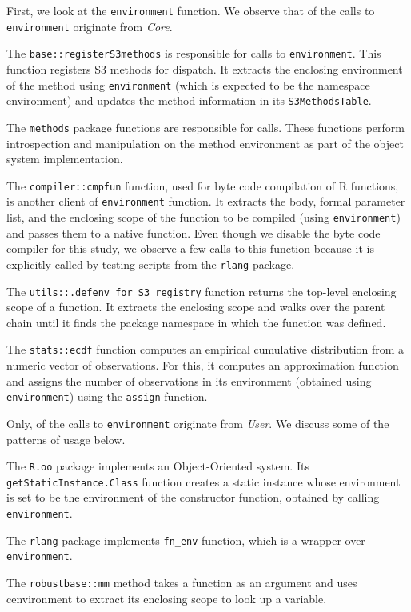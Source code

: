 \documentclass[10pt,review,sigplan,anonymous=true,authorversion=true,nonacm=true]{acmart}
\renewcommand{\c}[1]{\lstinline |#1|\xspace}
\begin{document}
First, we look at the \c{environment} function. We observe that
\EnvironmentCoreCallPerc of the calls to \c{environment} originate from
\emph{Core}.

The \c{base::registerS3methods} is responsible for
\EnvironmentBaseRegisterMethodCallPerc calls to
\c{environment}. This function registers S3 methods for dispatch. It extracts
the enclosing environment of the method using \c{environment} (which is expected
to be the namespace environment) and updates the method information in its
\c{S3MethodsTable}.

The \c{methods} package functions are responsible for
\EnvironmentMethodsCallPerc calls. These functions perform introspection and
manipulation on the method environment as part of the object system
implementation.

The \c{compiler::cmpfun} function, used for byte code compilation of R
functions, is another client of \c{environment} function. It extracts the body,
formal parameter list, and the enclosing scope of the function to be compiled
(using \c{environment}) and passes them to a native function. Even though we
disable the byte code compiler for this study, we observe a few calls to this
function because it is explicitly called by testing scripts from the \c{rlang}
package.

The \c{utils::.defenv_for_S3_registry} function returns the top-level enclosing
scope of a function. It extracts the enclosing scope and walks over the parent
chain until it finds the package namespace in which the function was defined.

The \c{stats::ecdf} function computes an empirical cumulative distribution from
a numeric vector of observations. For this, it computes an approximation
function and assigns the number of observations in its environment (obtained
using \c{environment}) using the \c{assign} function.

Only, \EnvironmentUserCallPerc of the calls to \c{environment} originate from
\emph{User}. We discuss some of the patterns of usage below.

The \c{R.oo} package implements an Object-Oriented system. Its
\c{getStaticInstance.Class} function creates a static instance whose environment
is set to be the environment of the constructor function, obtained by calling
\c{environment}.

The \c{rlang} package implements \c{fn_env} function, which is a wrapper over
\c{environment}.

The \c{robustbase::mm} method takes a function as an argument and uses
c{environment} to extract its enclosing scope to look up a variable.
\end{document}
